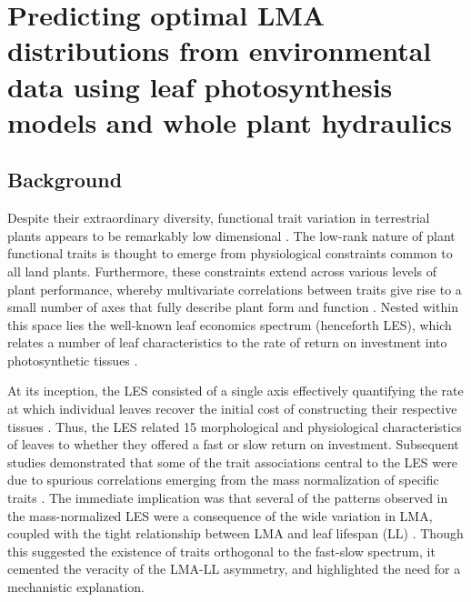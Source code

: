 \chapter{ Predicting optimal LMA distributions from environmental data using leaf photosynthesis models and whole plant hydraulics}

\section{Background}


Despite their extraordinary diversity, functional trait variation in terrestrial plants appears to be remarkably low dimensional \cite{diaz_global_2016}. The low-rank nature of plant functional traits is thought to emerge from physiological constraints common to all land plants. Furthermore, these constraints extend across various levels of plant performance, whereby multivariate correlations between traits give rise to a small number of axes that fully describe plant form and function \cite{reich2014a}. Nested within this space lies the well-known leaf economics spectrum (henceforth LES), which relates a number of leaf characteristics to the rate of return on investment into photosynthetic tissues \cite{wright2004a}. 

At its inception, the LES consisted of a single axis effectively quantifying the rate at which individual leaves recover the initial cost of constructing their respective tissues \cite{wright2004a}. Thus, the LES related 15 morphological and physiological characteristics of leaves to whether they offered a fast or slow return on investment. Subsequent studies demonstrated that some of the trait associations central to the LES were due to spurious correlations emerging from the mass normalization of specific traits \cite{osnas2013a}. The immediate implication was that several of the patterns observed in the mass-normalized LES were a consequence of the wide variation in LMA, coupled with the tight relationship between LMA and leaf lifespan (LL) \cite{osnas2013a}. Though this suggested the existence of traits orthogonal to the fast-slow spectrum, it cemented the veracity of the LMA-LL asymmetry, and highlighted the need for a mechanistic explanation.

